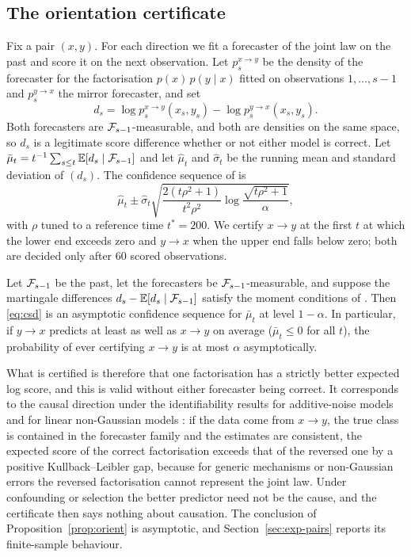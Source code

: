 \subsection{The orientation certificate}\label{sec:orientation}

Fix a pair $(x,y)$. For each direction we fit a forecaster of the joint law on
the past and score it on the next observation. Let
$p^{x\to y}_s$ be the density of the forecaster for the factorisation
$p(x)\,p(y\mid x)$ fitted on observations $1,\dots,s-1$ and $p^{y\to x}_s$ the
mirror forecaster, and set
\begin{equation}\label{eq:increment}
d_s=\log p^{x\to y}_s(x_s,y_s)-\log p^{y\to x}_s(x_s,y_s).
\end{equation}
Both forecasters are $\mathcal{F}_{s-1}$-measurable, and both are densities on the
same space, so $d_s$ is a legitimate score difference whether or not either
model is correct. Let $\bar\mu_t=t^{-1}\sum_{s\le t}\mathbb{E}[d_s\mid\mathcal{F}_{s-1}]$
and let $\hat\mu_t$ and $\hat\sigma_t$ be the running mean and standard
deviation of $(d_s)$. The confidence sequence of
\citet[Theorem~2.2]{waudbysmith2024asymptotic} is
\begin{equation}\label{eq:csd}
\hat\mu_t\pm\hat\sigma_t\sqrt{\frac{2(t\rho^2+1)}{t^2\rho^2}
\log\frac{\sqrt{t\rho^2+1}}{\alpha}},
\end{equation}
with $\rho$ tuned to a reference time $t^\ast=200$. We certify $x\to y$ at the
first $t$ at which the lower end exceeds zero and $y\to x$ when the upper end
falls below zero; both are decided only after $60$ scored observations.

\begin{proposition}\label{prop:orient}
Let $\mathcal{F}_{s-1}$ be the past, let the forecasters be $\mathcal{F}_{s-1}$-measurable,
and suppose the martingale differences $d_s-\mathbb{E}[d_s\mid\mathcal{F}_{s-1}]$ satisfy
the moment conditions of \citet[Theorem~2.2]{waudbysmith2024asymptotic}. Then
\eqref{eq:csd} is an asymptotic confidence sequence for $\bar\mu_t$ at level
$1-\alpha$. In particular, if $y\to x$ predicts at least as well as $x\to y$
on average ($\bar\mu_t\le 0$ for all $t$), the probability of ever certifying
$x\to y$ is at most $\alpha$ asymptotically.
\end{proposition}

\noindent What is certified is therefore that one factorisation has a
strictly better expected log score, and this is valid without either
forecaster being correct. It corresponds to the causal direction under the
identifiability results for additive-noise models
\citep{hoyer2009nonlinear,peters2014identifiability} and for linear
non-Gaussian models \citep{shimizu2006linear}: if the data come from
$x\to y$, the true class is contained in the forecaster family and the
estimates are consistent, the expected score of the correct factorisation
exceeds that of the reversed one by a positive Kullback--Leibler gap, because
for generic mechanisms or non-Gaussian errors the reversed factorisation cannot
represent the joint law. Under confounding or selection the better predictor
need not be the cause, and the certificate then says nothing about causation.
The conclusion of Proposition~\ref{prop:orient} is asymptotic, and
Section~\ref{sec:exp-pairs} reports its finite-sample behaviour.

